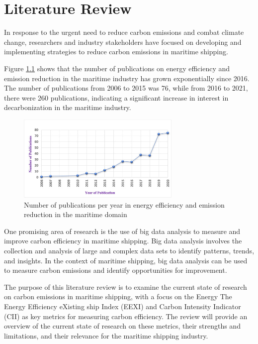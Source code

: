 \chapter{Literature Review}

In response to the urgent need to reduce carbon emissions and combat climate change, researchers and industry stakeholders have focused on developing and implementing strategies to reduce carbon emissions in maritime shipping.

Figure \ref{publicationRate} shows that the number of publications on energy efficiency and emission reduction in the maritime industry has grown exponentially since 2016. The number of publications from 2006 to 2015 was 76, while from 2016 to 2021, there were 260 publications, indicating a significant increase in interest in decarbonization in the maritime industry.
\autocite{JIMENEZ2022132888}

\begin{figure}[h]
    \centering
    \includegraphics[width=0.7\textwidth]{images/publication_rate.jpg}
    \caption{Number of publications per year in energy efficiency and emission reduction in the maritime domain}
    \label{publicationRate}
\end{figure}

One promising area of research is the use of big data analysis to measure and improve carbon efficiency in maritime shipping. Big data analysis involves the collection and analysis of large and complex data sets to identify patterns, trends, and insights. In the context of maritime shipping, big data analysis can be used to measure carbon emissions and identify opportunities for improvement.

The purpose of this literature review is to examine the current state of research on carbon emissions in maritime shipping, with a focus on the Energy The Energy Efficiency eXisting ship Index (EEXI) and Carbon Intensity Indicator (CII) as key metrics for measuring carbon efficiency. The review will provide an overview of the current state of research on these metrics, their strengths and limitations, and their relevance for the maritime shipping industry.


